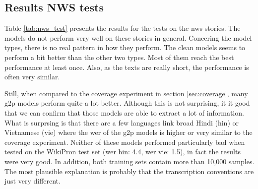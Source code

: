 
\subsection{Results NWS tests}
Table \ref{tab:nws_test} presents the results for the tests on the \ac{nws} stories. The models do not perform very well on these stories in general. Concering the model types, there is no real pattern in how they perform. The clean models seems to perform a bit better than the other two types. Most of them reach the best performance at least once. Also, as the texts are really short, the performance is often very similar.

Still, when compared to the coverage experiment in section \ref{sec:coverage}, many \ac{g2p} models perform quite a lot better. Although this is not surprising, it it good that we can confirm that those models are able to extract a lot of information. What is surprsing is that there are a few languages link broad Hindi (hin) or Vietnamese (vie) where the \ac{wer} of the \ac{g2p} models is higher or very similar to the coverage experiment. Neither of these models performed particularly bad when tested on the WikiPron test set (\ac{wer} hin: 4.4, \ac{wer} vie: 1.5), in fact the results were very good. In addition, both training sets contain more than 10,000 samples. The most plausible explanation is probably that the transcription conventions are just very different. 


